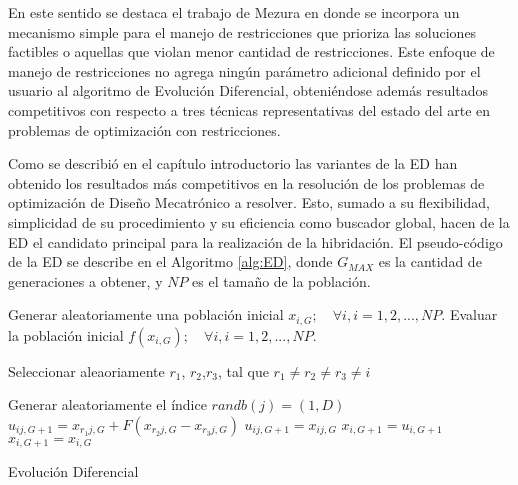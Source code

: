 En este sentido se destaca el trabajo de Mezura en \cite{mezura2004simple} donde se incorpora un mecanismo simple para el manejo de restricciones que prioriza las soluciones factibles o aquellas que violan menor cantidad de restricciones. Este enfoque de manejo de restricciones no agrega ningún parámetro adicional definido por el usuario al algoritmo de Evolución Diferencial, obteniéndose además resultados competitivos con respecto a tres técnicas representativas del estado del arte en problemas de optimización con restricciones.

Como se describió en el capítulo introductorio las variantes de la ED han obtenido los resultados más competitivos en la resolución de los problemas de optimización de Diseño Mecatrónico a resolver. Esto, sumado a su flexibilidad, simplicidad de su procedimiento y su eficiencia como buscador global, hacen de la ED el candidato principal para la realización de la hibridación. El pseudo-código de la ED se describe en el Algoritmo \ref{alg:ED}, donde $G_{MAX}$ es la cantidad de generaciones a obtener, y $NP$ es el tamaño de la población.
\begin{algorithm}
	\begin{algorithmic}[1]
		\STATE Generar aleatoriamente una población inicial $x_{i,G}; \quad \forall i,i = 1, 2, ..., NP$. 
        \STATE Evaluar la población inicial $f(x_{i,G}); \quad  \forall i,i = 1, 2, ..., NP$. 

             \STATE Seleccionar aleaoriamente $r_1$, $r_2$,$r_3$, tal que $ r_1 \neq r_2 \neq r_3  \neq i$
             
             \STATE Generar aleatoriamente el índice $randb(j)=(1,D)$ 
              	\STATE $u_{ij,G+1} = x_{r_1j,G} + F (x_{r_2 j ,G}-x_{r_3 j,G})$
              	\ELSE 
                  \STATE $u_{ij,G+1} = x_{ij,G}$
                \ENDIF
              \ENDFOR
                  \STATE $x_{i,G+1} = u_{i,G+1}$
                  \ELSE
                 \STATE $x_{i,G+1} = x_{i,G}$
               \ENDIF
           \ENDFOR
          \ENDFOR
        
	\end{algorithmic}
	\caption{Evolución Diferencial}\label{alg:ED}
\end{algorithm}


